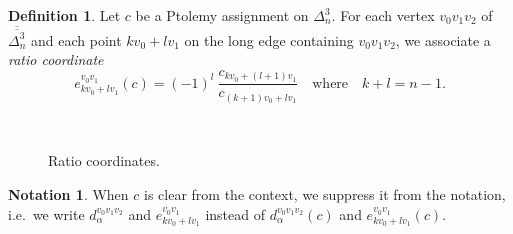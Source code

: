 \documentclass[12pt]{amsart}
\theoremstyle{definition}
\newtheorem{definition}[theorem]{Definition}
\newtheorem{notation}[theorem]{Notation}
\numberwithin{equation}{section}
\begin{document}
\begin{definition}
Let $c$ be a Ptolemy assignment on $\Delta_n^3$. For each vertex $v_0v_1v_2$ of $\overline{\overline{\Delta^3_n}}$ and each point $kv_0+lv_1$ on the long edge containing $v_0v_1v_2$, we associate a \emph{ratio coordinate}
$$e^{v_0v_1}_{kv_0+lv_1}(c)= (-1)^{l} ~ \frac{c_{kv_0+(l+1)v_1}}{c_{(k+1)v_0+lv_1}}\quad\mbox{where}\quad k+l=n-1.$$
\end{definition}

\begin{figure}[htb]
\begin{center}
\begin{minipage}[c]{0.4\textwidth}

\end{minipage}
\hfill
\begin{minipage}[c]{0.4\textwidth}

\end{minipage}
\hfill
\\ \vspace{-0.4cm}
\begin{minipage}[t]{0.4\textwidth}
\caption{Diamond coordinates.}\label{fig:DiamondCoordinates}
\end{minipage}
\begin{minipage}[t]{0.4\textwidth}
\caption{Ratio coordinates.}\label{fig:RatioCoordinates}
\end{minipage}
\end{center}
\end{figure}
\begin{notation}When $c$ is clear from the context, we suppress it from the notation, i.e.~we write $d^{v_0v_1v_2}_\alpha$ and $e^{v_0v_1}_{kv_0+lv_1}$ instead of $d^{v_0v_1v_2}_\alpha(c)$ and $e^{v_0v_1}_{kv_0+lv_1}(c)$.
\end{notation}
\end{document}
